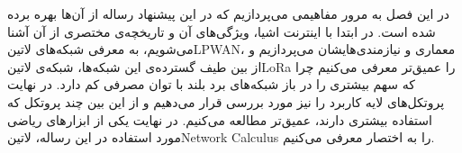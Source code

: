 
در این فصل به مرور مفاهیمی می‌پردازیم که در این پیشنهاد رساله از آن‌ها بهره برده شده است. در ابتدا با اینترنت اشیا، ویژگی‌های آن و تاریخچه‌ی مختصری از آن آشنا می‌شویم،
به معرفی شبکه‌های ‌لاتین{LPWAN}، معماری و نیازمندی‌هایشان
می‌پردازیم و از بین طیف گسترده‌ی این شبکه‌ها، شبکه‌ی ‌لاتین{LoRa} را عمیق‌تر
معرفی می‌کنیم چرا که سهم بیشتری را در باز شبکه‌های برد بلند با توان مصرفی کم دارد.
در نهایت پروتکل‌های لایه کاربرد را نیز مورد بررسی قرار می‌دهیم و از این بین چند پروتکل که استفاده بیشتری دارند، عمیق‌تر مطالعه می‌کنیم.
در نهایت یکی از ابزارهای ریاضی مورد استفاده در این رساله، ‌لاتین{Network Calculus} را به اختصار معرفی می‌کنیم.






